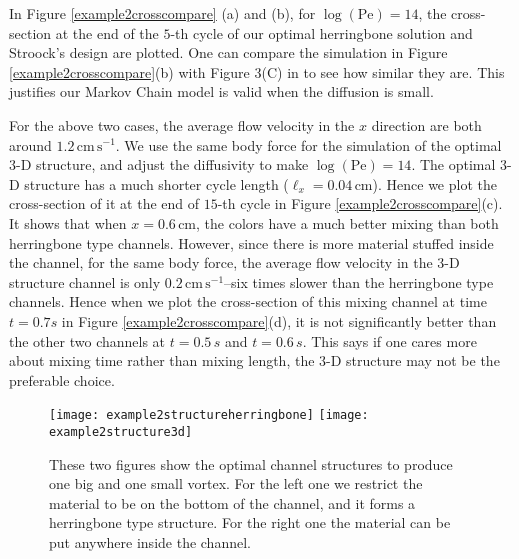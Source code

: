 In Figure \ref{example2crosscompare} (a) and (b), for
$\log(\text{Pe})=14$, the cross-section at the end of the $5$-th cycle
of our optimal herringbone solution and Stroock's design are plotted.
One can compare the simulation in Figure \ref{example2crosscompare}(b)
with Figure 3(C) in \cite{Stroock2002} to see how similar they are.
This justifies our Markov Chain model is valid when the diffusion is
small.


For the above two cases, the average flow velocity in the $x$
direction are both around $1.2\, \text{cm} \,\text{s}^{-1}$. We use
the same body force for the simulation of the optimal $3$-D structure,
and adjust the diffusivity to make $\log(\text{Pe})=14$. The optimal
$3$-D structure has a much shorter cycle length
($\ell_x=0.04\,\text{cm}$). Hence we plot the cross-section of it at the
end of $15$-th cycle in Figure \ref{example2crosscompare}(c). It shows
that when $x=0.6\, \text{cm}$, the colors have a much better mixing
than both herringbone type channels. However, since there is more
material stuffed inside the channel, for the same body force, the
average flow velocity in the 3-D structure channel is only $0.2\,
\text{cm} \,\text{s}^{-1}$--six times slower than the herringbone type
channels. Hence when we plot the cross-section of this mixing channel
at time $t=0.7s$ in Figure \ref{example2crosscompare}(d), it is not
significantly better than the other two channels at $t=0.5\,s$ and
$t=0.6\,s$. This says if one cares more about mixing time rather than mixing length, 
the $3$-D structure may not be the preferable choice. 


  \begin{figure}
    \centerline{
     \texttt{[image: example2structureherringbone]}
     \texttt{[image: example2structure3d]}
      }
    \caption{\label{example2structureNew} These two figures show the optimal channel structures to produce one big and one small vortex. For the left one we restrict the material to be on the bottom of the channel, and it forms a herringbone type structure. For the right one the material can be put anywhere inside the channel.}
  \end{figure}

